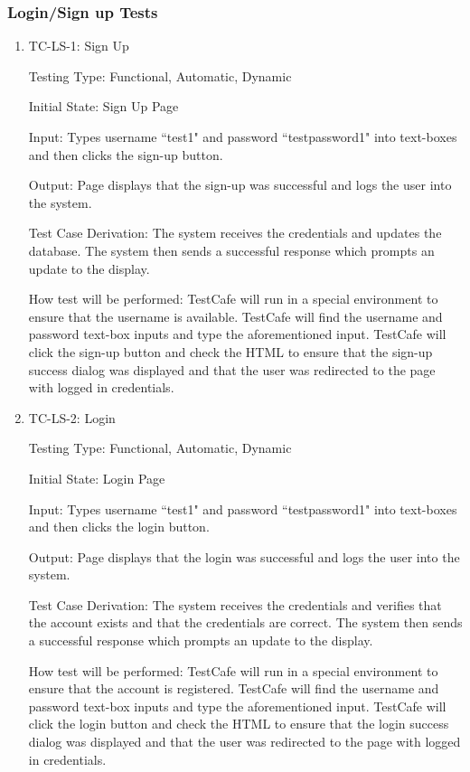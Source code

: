 \documentclass[12pt, titlepage]{article}
\begin{document}
\subsubsection{Login/Sign up Tests}

\begin{enumerate}
\item {TC-LS-1: Sign Up}
    
Testing Type: Functional, Automatic, Dynamic
					
Initial State: Sign Up Page
					
Input: Types username ``test1" and password ``testpassword1" into text-boxes and then clicks the sign-up button.
					
Output: Page displays that the sign-up was successful and logs the user into the system.

Test Case Derivation: The system receives the credentials and updates the database. The system then sends a successful response which prompts an update to the display. 
					
How test will be performed: TestCafe will run in a special environment to ensure that the username is available. TestCafe will find the username and password text-box inputs and type the aforementioned input. TestCafe will click the sign-up button and check the HTML to ensure that the sign-up success dialog was displayed and that the user was redirected to the page with logged in credentials.

\item {TC-LS-2: Login}
    
Testing Type: Functional, Automatic, Dynamic
					
Initial State: Login Page
					
Input: Types username ``test1" and password ``testpassword1" into text-boxes and then clicks the login button.
					
Output: Page displays that the login was successful and logs the user into the system.

Test Case Derivation: The system receives the credentials and verifies that the account exists and that the credentials are correct. The system then sends a successful response which prompts an update to the display.
					
How test will be performed: TestCafe will run in a special environment to ensure that the account is registered. TestCafe will find the username and password text-box inputs and type the aforementioned input. TestCafe will click the login button and check the HTML to ensure that the login success dialog was displayed and that the user was redirected to the page with logged in credentials.


\end{enumerate}
\end{document}
